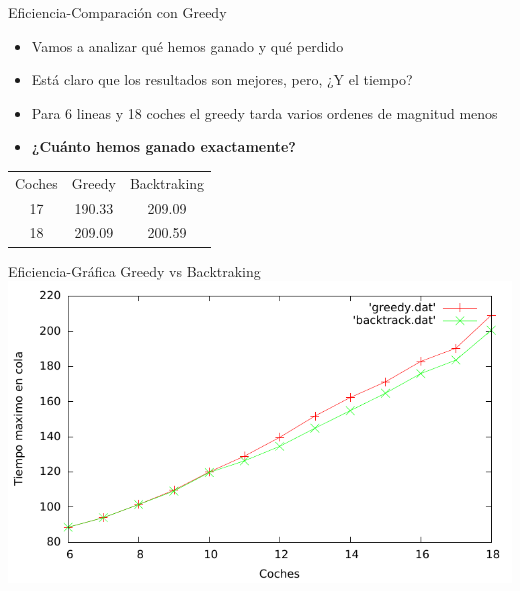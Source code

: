 \begin{frame}{Eficiencia-Comparación con Greedy}
	\begin{itemize}
		\item Vamos a analizar qué hemos ganado y qué perdido
		\pause
		\item Está claro que los resultados son mejores, pero, ¿Y el tiempo?
		\pause
		\item Para 6 lineas y 18 coches el greedy tarda varios ordenes de magnitud menos
		\item \textbf{¿Cuánto hemos ganado exactamente?}
		

	\end{itemize}
	\begin{center}
			\begin{tabular}{c|c|c}
				Coches	& Greedy  & Backtraking  \\ 
				17	& 190.33 &  209.09\\ 
				18	& 209.09 & 200.59
			\end{tabular}
			
	\end{center}

\end{frame}

\begin{frame}{Eficiencia-Gráfica Greedy vs Backtraking}
	\includegraphics[width = \linewidth]{./img/comp.pdf}
\end{frame}




